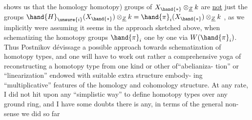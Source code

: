 shows us that the homology \deleted{(=} homotopy) groups of $X_{\hand{\ast}}\otimes_{\underline{Z}}k$ are \uline{not} just
the groups $\hand{H}_{\unsure{i}}(X_{\hand{\ast}})\otimes_{\underline{Z}}k = \hand{\pi}_i(X_{\hand{\ast}})\otimes_{\underline{Z}}k$ , as we implicitly were assuming it
seems in the approach sketched above, when schematizing the homotopy
groups $\hand{\pi}_i$  one by one via $W(\hand{\pi}_i)$. Thus  Postnikov dévissage  
a possible approach towards schematization of homotopy types, and one
will have to work out rather a comprehensive yoga of reconstructing
a homotopy type from  one kind or other of``abelianiza-%
tion'' or ``linearization''  endowed with suitable extra structure embody-%
ing ``multiplicative'' features of the homology and cohomology structure.
At any rate, I did not hit upon any ``simplistic way'' to define homotopy
types over any ground ring, and I have some doubts there is any, in
terms of the general non-sense  we did so far 

